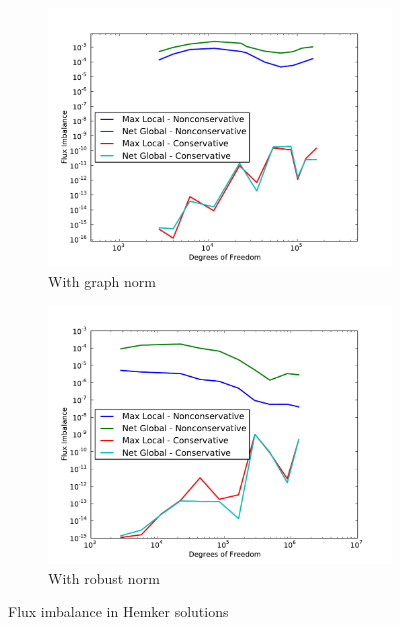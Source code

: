 \documentclass[letterpaper]{article}
\begin{document}
\begin{figure}
\centering
\begin{subfigure}[t]{0.45\textwidth}
\centering
\includegraphics[width=\textwidth]{figs/Hemker/graphFlux.pdf}
\caption{With graph norm}
\label{fig:hemkerGraphFlux}
\end{subfigure}
\begin{subfigure}[t]{0.45\textwidth}
\centering
\includegraphics[width=\textwidth]{figs/Hemker/robustFlux.pdf}
\caption{With robust norm}
\label{fig:hemkerRobustFlux}
\end{subfigure}
\caption{Flux imbalance in Hemker solutions}
\label{fig:hemker_flux}
\end{figure}



\end{document}
